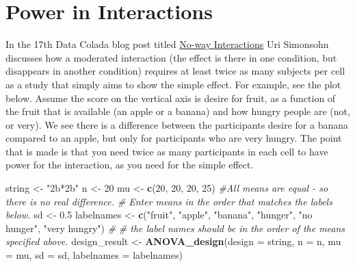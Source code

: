 \documentclass[]{book}
\newenvironment{Shaded}{\begin{snugshade}}{\end{snugshade}}
\newcommand{\CommentTok}[1]{\textcolor[rgb]{0.56,0.35,0.01}{\textit{#1}}}
\newcommand{\DataTypeTok}[1]{\textcolor[rgb]{0.13,0.29,0.53}{#1}}
\newcommand{\DecValTok}[1]{\textcolor[rgb]{0.00,0.00,0.81}{#1}}
\newcommand{\FloatTok}[1]{\textcolor[rgb]{0.00,0.00,0.81}{#1}}
\newcommand{\KeywordTok}[1]{\textcolor[rgb]{0.13,0.29,0.53}{\textbf{#1}}}
\newcommand{\NormalTok}[1]{#1}
\newcommand{\StringTok}[1]{\textcolor[rgb]{0.31,0.60,0.02}{#1}}
\begin{document}
\hypertarget{power-in-interactions}{%
\chapter{Power in Interactions}\label{power-in-interactions}}

In the 17th Data Colada blog post titled \href{http://datacolada.org/17}{No-way Interactions} Uri Simonsohn discusses how a moderated interaction (the effect is there in one condition, but disappears in another condition) requires at least twice as many subjects per cell as a study that simply aims to show the simple effect. For example, see the plot below. Assume the score on the vertical axis is desire for fruit, as a function of the fruit that is available (an apple or a banana) and how hungry people are (not, or very). We see there is a difference between the participants desire for a banana compared to an apple, but only for participants who are very hungry. The point that is made is that you need twice as many participants in each cell to have power for the interaction, as you need for the simple effect.

\begin{Shaded}
\begin{Highlighting}[]
\NormalTok{string <-}\StringTok{ "2b*2b"}
\NormalTok{n <-}\StringTok{ }\DecValTok{20}
\NormalTok{mu <-}\StringTok{ }\KeywordTok{c}\NormalTok{(}\DecValTok{20}\NormalTok{, }\DecValTok{20}\NormalTok{, }\DecValTok{20}\NormalTok{, }\DecValTok{25}\NormalTok{) }\CommentTok{#All means are equal - so there is no real difference.}
\CommentTok{# Enter means in the order that matches the labels below.}
\NormalTok{sd <-}\StringTok{ }\FloatTok{0.5}
\NormalTok{labelnames <-}\StringTok{ }\KeywordTok{c}\NormalTok{(}\StringTok{"fruit"}\NormalTok{, }\StringTok{"apple"}\NormalTok{, }\StringTok{"banana"}\NormalTok{, }\StringTok{"hunger"}\NormalTok{, }\StringTok{"no hunger"}\NormalTok{, }\StringTok{"very hungry"}\NormalTok{) }\CommentTok{#}
\CommentTok{# the label names should be in the order of the means specified above.}
\NormalTok{design_result <-}\StringTok{ }\KeywordTok{ANOVA_design}\NormalTok{(}\DataTypeTok{design =}\NormalTok{ string,}
                   \DataTypeTok{n =}\NormalTok{ n, }
                   \DataTypeTok{mu =}\NormalTok{ mu, }
                   \DataTypeTok{sd =}\NormalTok{ sd, }
                   \DataTypeTok{labelnames =}\NormalTok{ labelnames)}
\end{Highlighting}
\end{Shaded}
\end{document}
